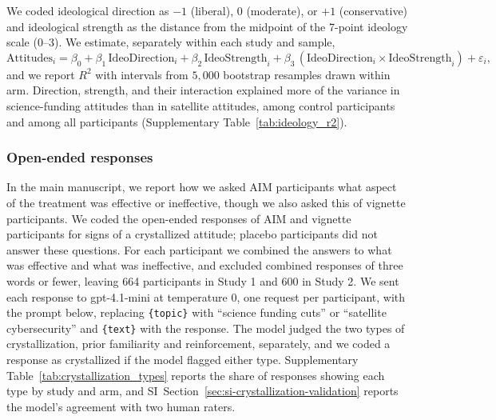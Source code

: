\documentclass[11pt]{article}
\begin{document}
We coded ideological direction as $-1$ (liberal), $0$ (moderate), or $+1$ (conservative) and ideological strength as the distance from the midpoint of the 7-point ideology scale (0--3). We estimate, separately within each study and sample,
\begin{equation*}
\text{Attitudes}_i = \beta_0 + \beta_1\,\text{IdeoDirection}_i + \beta_2\,\text{IdeoStrength}_i
+ \beta_3\,(\text{IdeoDirection}_i \times \text{IdeoStrength}_i) + \varepsilon_i,
\end{equation*}
and we report $R^2$ with intervals from $5{,}000$ bootstrap resamples drawn within arm. Direction, strength, and their interaction explained more of the variance in science-funding attitudes than in satellite attitudes, among control participants and among all participants (Supplementary Table~\ref{tab:ideology_r2}).

{\footnotesize

}

\subsubsection{Open-ended responses}
\label{sec:si-crystallization-coding}

In the main manuscript, we report how we asked AIM participants what aspect of the treatment was effective or ineffective, though we also asked this of vignette participants. We coded the open-ended responses of AIM and vignette participants for signs of a crystallized attitude; placebo participants did not answer these questions. For each participant we combined the answers to what was effective and what was ineffective, and excluded combined responses of three words or fewer, leaving 664 participants in Study 1 and 600 in Study 2. We sent each response to gpt-4.1-mini at temperature 0, one request per participant, with the prompt below, replacing \texttt{\{topic\}} with ``science funding cuts'' or ``satellite cybersecurity'' and \texttt{\{text\}} with the response. The model judged the two types of crystallization, prior familiarity and
reinforcement, separately, and we coded a response as crystallized if the
model flagged either type. Supplementary Table~\ref{tab:crystallization_types}
reports the share of responses showing each type by study and arm, and
SI~Section~\ref{sec:si-crystallization-validation} reports the model's
agreement with two human raters.
\end{document}
